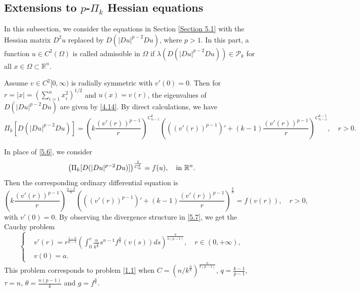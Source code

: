 \documentclass[a4paper,11pt]{amsart}
\theoremstyle{plain}
\theoremstyle{remark}
\numberwithin{equation}{section}
\numberwithin{figure}{section}
\numberwithin{remark}{section}
\begin{document}
\begin{sloppypar}
\subsection{Extensions to $p$-$\Pi_k$ Hessian equations}\label{Section 5.2}
In this subsection, we consider the equations in Section \ref{Section 5.1} with the Hessian matrix $D^2u$ replaced by $D(|Du|^{p-2}Du)$, where $p> 1$. In this part, a function $u\in C^2(\Omega)$ is called admissible in $\Omega$ if $\lambda(D(|Du|^{p-2}Du))\in {\mathcal P}_{k}$ for all $x\in \Omega\subset \mathbb{R}^n$.

Assume $v\in C^2[0, \infty)$ is radially symmetric with $v'(0)=0$. Then for $r=|x|=(\sum\limits_{i=1}^n x_i^2)^{1/2}$ and  $u(x)=v(r)$, the eigenvalues of $D(|Du|^{p-2}Du)$ are given by \eqref{4.14}. By direct calculations, we have
	\begin{equation}\label{5.12}
	\Pi_k[D(|Du|^{p-2}Du)]=\left(k\frac{(v'(r))^{p-1}}{r}\right)^{C_{n-1}^k}\left(((v'(r))^{p-1})'+(k-1)\frac{(v'(r))^{p-1}}{r}\right)^{C_{n-1}^{k-1}}, \quad r>0.
	\end{equation}

In place of \eqref{5.6}, we consider
	\begin{equation}\label{5.13}
	\left (\Pi_k[D(|Du|^{p-2}Du)] \right )^{\frac{1}{C_n^k}} = f(u), \quad {\rm in} \ \mathbb{R}^n.
	\end{equation}
Then the corresponding ordinary differential equation is
	\begin{equation}\label{5.14}
	\left(k\frac{(v'(r))^{p-1}}{r}\right)^{\frac{n-k}{n}}\left(((v'(r))^{p-1})'+(k-1)\frac{(v'(r))^{p-1}}{r}\right)^{\frac{k}{n}} = f(v(r)), \quad r>0,
	\end{equation}
with $v'(0)=0$. By observing the divergence structure in \eqref{5.7}, we get the Cauchy problem
	\begin{equation}\label{5.15}
	\left\{
	\begin{aligned}
	&v'(r)=r^{\frac{1-k}{p-1}} \left ( \int_{0}^{r} \frac{n}{k^{\frac{n}{k}}} s^{n-1} f^{\frac{n}{k}} (v(s))ds\right)^{\frac{k}{n(p-1)}}, \quad r\in (0, +\infty), \\
	&v(0)=a.
	\end{aligned}
	\right.
	\end{equation}
	This problem corresponds to problem \eqref{1.1} when $C=(n/ k^{\frac{n}{k}})^{\frac{n}{k(p-1)}}$, $q=\frac{k-1}{p-1}$, $\tau =n$, $\theta=\frac{n(p-1)}{k}$ and $g=f^{\frac{n}{k}}$.


\end{sloppypar}
\end{document}
